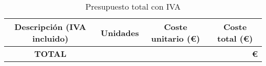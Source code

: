 \begin{table}[ht]
	\centering
	\begin{tabular}{|c|r|r|r|}
		\hline
		\rowcolor[HTML]{EFEFEF}
		\textbf{Descripción (IVA incluido)} & \multicolumn{1}{c|}{\cellcolor[HTML]{EFEFEF}\textbf{Unidades}}    & \multicolumn{1}{c|}{\cellcolor[HTML]{EFEFEF}\textbf{Coste unitario (€)}} & \multicolumn{1}{c|}{\cellcolor[HTML]{EFEFEF}\textbf{Coste total (€)}} \\ \hline
		\rowcolor[HTML]{FFFFC7}
		\textbf{TOTAL}                      & \multicolumn{3}{r|}{\cellcolor[HTML]{FFFFC7}\textbf{ €}}                                                                                                                                                    \\ \hline
	\end{tabular}
	\caption{Presupuesto total con IVA}
	\label{tab:budget}
\end{table}

